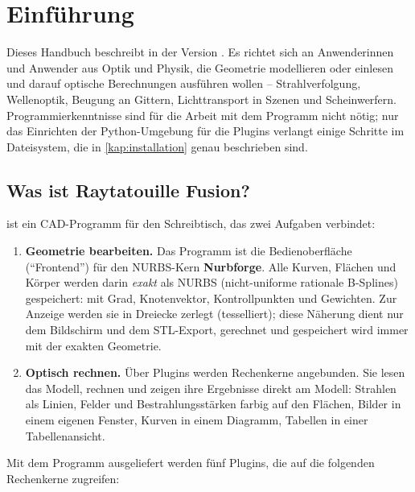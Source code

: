 \chapter{Einführung}\label{kap:einfuehrung}

Dieses Handbuch beschreibt \produkt{} in der Version \version. Es richtet sich an
Anwenderinnen und Anwender aus Optik und Physik, die Geometrie modellieren oder einlesen und
darauf optische Berechnungen ausführen wollen -- Strahlverfolgung, Wellenoptik, Beugung an
Gittern, Lichttransport in Szenen und Scheinwerfern. Programmierkenntnisse sind für die
Arbeit mit dem Programm nicht nötig; nur das Einrichten der Python-Umgebung für die Plugins
verlangt einige Schritte im Dateisystem, die in \autoref{kap:installation} genau beschrieben
sind.

\section{Was ist Raytatouille Fusion?}\label{sec:was-ist}

\produkt{} ist ein CAD-Programm für den Schreibtisch, das zwei Aufgaben verbindet:

\begin{enumerate}
  \item \textbf{Geometrie bearbeiten.} Das Programm ist die Bedienoberfläche
    (\enquote{Frontend}) für den NURBS-Kern \textbf{Nurbforge}. Alle Kurven,
    Flächen und Körper werden darin \emph{exakt} als NURBS (nicht-uniforme rationale
    B-Splines) gespeichert: mit Grad, Knotenvektor, Kontrollpunkten und Gewichten. Zur Anzeige
    werden sie in Dreiecke zerlegt (tesselliert); diese Näherung dient nur dem Bildschirm und
    dem STL-Export, gerechnet und gespeichert wird immer mit der exakten Geometrie.
  \item \textbf{Optisch rechnen.} Über Plugins werden Rechenkerne angebunden. Sie lesen das
    Modell, rechnen und zeigen ihre Ergebnisse direkt am Modell: Strahlen als Linien,
    Felder und Bestrahlungsstärken farbig auf den Flächen, Bilder in einem eigenen Fenster,
    Kurven in einem Diagramm, Tabellen in einer Tabellenansicht.
\end{enumerate}

Mit dem Programm ausgeliefert werden fünf Plugins, die auf die folgenden Rechenkerne
zugreifen:

